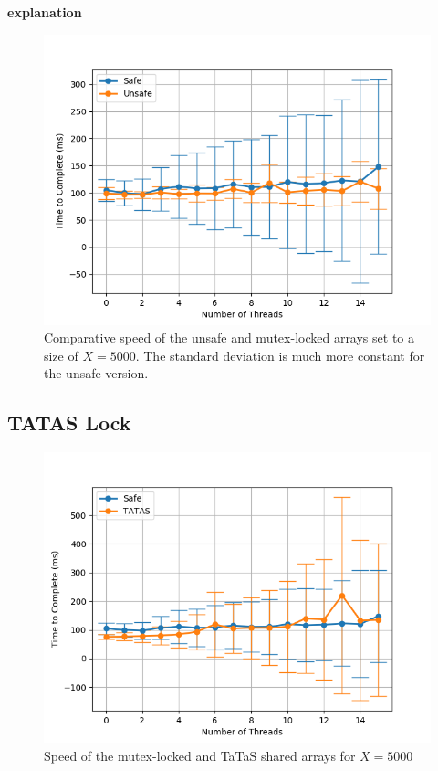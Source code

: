 \documentclass[11pt]{article}
\newcommand{\todo}[1]{\textbf{#1}}
\begin{document}
\todo{explanation}


\begin{figure}\label{step3_3}
\centering
\includegraphics[scale=0.65]{step3_3.png}
\caption{Comparative speed of the unsafe and mutex-locked arrays set to a size of $X=5000$. The standard deviation is much more constant for the unsafe version.}
\end{figure}


\subsection{TATAS Lock}

\begin{figure}\label{step4_1}
\centering
\includegraphics[scale=0.65]{step4_1.png}
\caption{Speed of the mutex-locked and TaTaS shared arrays for $X=5000$}
\end{figure}
\end{document}
